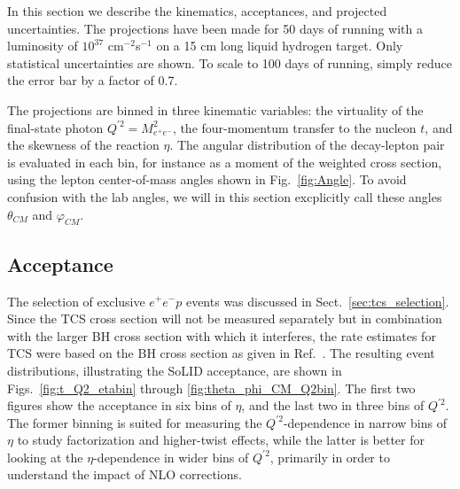 In this section we describe the kinematics, acceptances, and projected
uncertainties. The projections have been made for 50 days of running with a
luminosity of $10^{37}$ cm$^{-2}$s$^{-1}$ on a 15 cm long liquid hydrogen
target. Only statistical uncertainties are shown. To scale to 100 days of
running, simply reduce the error bar by a factor of 0.7.

The projections are binned in three  kinematic variables: the virtuality
of the final-state photon $Q^{\prime 2} = M_{e^+e^-}^2$, the four-momentum
transfer to the nucleon $t$, and the skewness of the reaction $\eta$. The
angular distribution of the decay-lepton pair is evaluated in each bin, for
instance as a moment of the weighted cross section, using the lepton
center-of-mass angles shown in Fig.~\ref{fig:Angle}. To avoid confusion with
the lab angles, we will in this section excplicitly call these angles
$\theta_{CM}$ and $\varphi_{CM}$.


\subsection{Acceptance}
\label{sec:acc}

The selection of exclusive $e^+e^-p$ events was discussed in
Sect.~\ref{sec:tcs_selection}. Since the TCS cross section will not be
measured separately but in combination with the larger BH cross section with
which it interferes, the rate estimates for TCS were based on the BH cross
section as given in Ref.~\cite{vadim}. The resulting event distributions, 
illustrating the SoLID acceptance, are shown in Figs.~\ref{fig:t_Q2_etabin}
through \ref{fig:theta_phi_CM_Q2bin}. The first two figures show the
acceptance in six bins of $\eta$, and the last two in three bins of
$Q^{\prime 2}$. The former binning is suited for measuring the
$Q^{\prime 2}$-dependence in narrow bins of $\eta$ to study factorization
and higher-twist effects, while the latter is better for looking at the
$\eta$-dependence in wider bins of $Q^{\prime 2}$, primarily in order to
understand the impact of NLO corrections.

